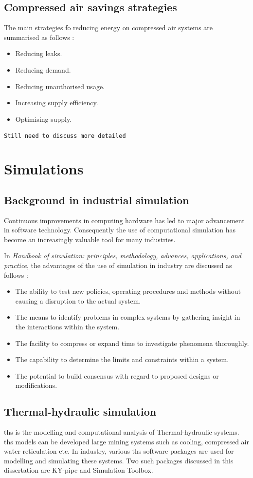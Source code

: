 	\subsection{Compressed air savings strategies}
		The main strategies fo reducing energy on compressed air systems are summarised as follows \cite{Snyman2011Masters}:
		\begin{itemize}
			\item Reducing leaks.
			\item Reducing demand.
			\item Reducing unauthorised usage.
			\item Increasing supply efficiency.
			\item Optimising supply.
		\end{itemize}
	\texttt{Still need to discuss more detailed}
	\section{Simulations }
	\subsection{Background in industrial simulation}
		Continuous improvements in computing hardware has led to major advancement in software technology. Consequently the use of computational simulation has become an increasingly valuable tool for many industries.\cite{kocsis2003integration} \par 
		In \textit{ Handbook of simulation: principles, methodology, advances, applications, and practice}, the advantages of the use of simulation in industry are discussed as follows \cite{banks1998handbook}: 
		\begin{itemize}
			\item The ability to test new policies, operating procedures and methods without causing a disruption to the actual system.
			\item The means to identify problems in complex systems by gathering insight in the interactions within the system.
			\item The facility to compress or expand time to investigate phenomena thoroughly.
			\item The capability to determine the limits and constraints within a system.
			\item The potential to build consensus with regard to proposed designs or modifications.
		\end{itemize}
	\subsection{Thermal-hydraulic simulation}
		\gls{ths} is the modelling and computational analysis of Thermal-hydraulic systems. \gls{ths} models can be developed large mining systems such as cooling, compressed air water reticulation etc. In industry, various \gls{ths} software packages are used for modelling and simulating these systems. Two such packages discussed in this dissertation are KY-pipe and Simulation Toolbox.
